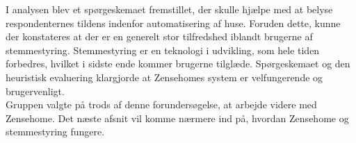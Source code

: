 I analysen blev et spørgeskemaet fremstillet, der skulle hjælpe med at belyse respondenternes tildens indenfor automatisering af huse. Foruden dette, kunne der konstateres at der er en generelt stor tilfredshed iblandt brugerne af stemmestyring. Stemmestyring er en teknologi i udvikling, som hele tiden forbedres, hvilket i sidste ende kommer brugerne tilglæde. Spørgeskemaet og den heuristisk evaluering klargjorde at Zensehomes system er velfungerende og brugervenligt.\\ 

Gruppen valgte på trods af denne forundersøgelse, at arbejde videre med Zensehome. Det næste afsnit vil komme nærmere ind på, hvordan Zensehome og stemmestyring fungere.